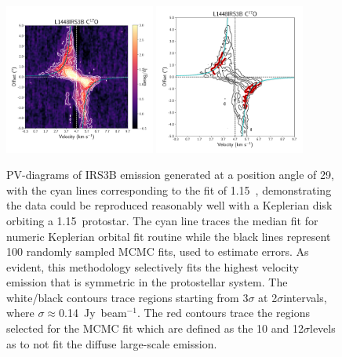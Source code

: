 \begin{figure}[H]
\begin{center}
\includegraphics[width=0.44\textwidth]{img/irs3b_c17o_pv.pdf}
\includegraphics[width=0.44\textwidth]{img/PV-Diagram_L1448IRS3B_C17O_image_taper1500k_fit_xtr.pdf}
\end{center}
\caption{PV-diagrams of IRS3B \cso\space emission generated at a position angle of 29\deg, with the cyan lines corresponding to the fit of 1.15~\solm, demonstrating the data could be reproduced reasonably well with a Keplerian disk orbiting a 1.15~\solm\space protostar. The cyan line traces the median fit for numeric Keplerian orbital fit routine while the black lines represent 100 randomly sampled MCMC fits, used to estimate errors. As evident, this methodology selectively fits the highest velocity emission that is symmetric in the protostellar system. The white/black contours trace regions starting from 3$\sigma$ at 2$\sigma$\space intervals, where $\sigma\approx$0.14~Jy~beam$^{-1}$. The red contours trace the regions selected for the MCMC fit which are defined as the 10 and 12$\sigma$\space levels as to not fit the diffuse large-scale emission.}\label{fig:l1448irs3b_c17o_pv}
\end{figure}








